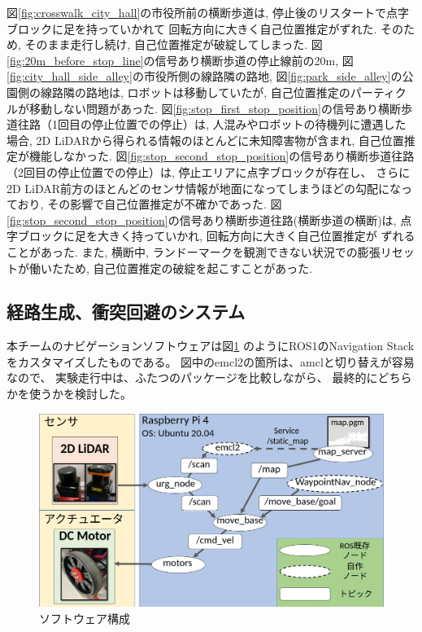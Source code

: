 \documentclass[twocolumn,9pt]{jsproceedings}
\begin{document}
図\ref{fig:crosswalk_city_hall}の市役所前の横断歩道は, 停止後のリスタートで点字ブロックに足を持っていかれて
回転方向に大きく自己位置推定がずれた. そのため, そのまま走行し続け, 自己位置推定が破綻してしまった. 
図\ref{fig:20m_before_stop_line}の信号あり横断歩道の停止線前の20m, 
図\ref{fig:city_hall_side_alley}の市役所側の線路隣の路地, 図\ref{fig:park_side_alley}の公園側の線路隣の路地は, 
ロボットは移動していたが, 自己位置推定のパーティクルが移動しない問題があった. 
図\ref{fig:stop_first_stop_position}の信号あり横断歩道往路（1回目の停止位置での停止）は, 人混みやロボットの待機列に遭遇した
場合, 2D LiDARから得られる情報のほとんどに未知障害物が含まれ, 自己位置推定が機能しなかった. 
図\ref{fig:stop_second_stop_position}の信号あり横断歩道往路（2回目の停止位置での停止）は, 停止エリアに点字ブロックが存在し、
さらに2D LiDAR前方のほとんどのセンサ情報が地面になってしまうほどの勾配になっており, 
その影響で自己位置推定が不確かであった.
図\ref{fig:stop_second_stop_position}の信号あり横断歩道往路(横断歩道の横断)は, 点字ブロックに足を大きく持っていかれ, 回転方向に大きく自己位置推定が
ずれることがあった. 
また, 横断中, ランドーマークを観測できない状況での膨張リセットが働いたため, 自己位置推定の破綻を起こすことがあった. 

\subsection{経路生成、衝突回避のシステム}

本チームのナビゲーションソフトウェアは図\ref{fig:software}
のようにROS1のNavigation Stackをカスタマイズしたものである。
図中のemcl2の箇所は、amclと切り替えが容易なので、
実験走行中は、ふたつのパッケージを比較しながら、
最終的にどちらかを使うかを検討した。
\begin{figure}[h]
  \begin{center}
    \includegraphics[width=1.0\linewidth]{figs/software.pdf}
    \caption{ソフトウェア構成}
    \label{fig:software}
  \end{center}
\end{figure}
\end{document}
